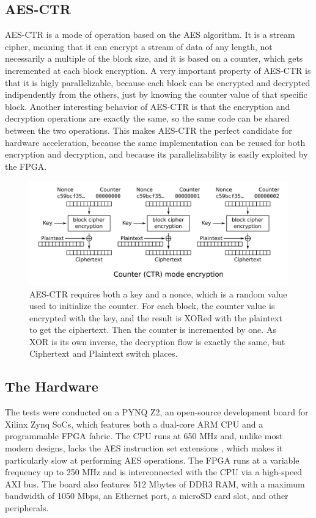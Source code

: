 \documentclass[12pt,oneside,a4paper]{article}
\begin{document}
\subsection{AES-CTR} \label{subsec:aes-ctr}
AES-CTR \cite{aes:ctr} is a mode of operation based on the AES algorithm. It is a stream cipher, meaning that it can encrypt a stream of data of any length, not necessarily a multiple of the block size, and it is based on a counter, which gets incremented at each block encryption.
A very important property of AES-CTR is that it is higly parallelizable, because each block can be encrypted and decrypted indipendently from the others, just by knowing the counter value of that specific block.
Another interesting behavior of AES-CTR is that the encryption and decryption operations are exactly the same, so the same code can be shared between the two operations.
This makes AES-CTR the perfect candidate for hardware acceleration, because the same implementation can be reused for both encryption and decryption, and because its parallelizability is easily exploited by the FPGA.
\begin{figure}[h!]
	\centering
	\includegraphics[width=\textwidth]{CTR_encryption_scheme.png}
	\caption{AES-CTR requires both a key and a nonce, which is a random value used to initialize the counter. For each block, the counter value is encrypted with the key, and the result is XORed with the plaintext to get the ciphertext. Then the counter is incremented by one. As XOR is its own inverse, the decryption flow is exactly the same, but Ciphertext and Plaintext switch places. \cite{pic:aes-ctr}}
\end{figure}

\subsection{The Hardware} \label{subsec:the-hardware}
The tests were conducted on a PYNQ Z2, an open-source development board for Xilinx Zynq SoCs, which features both a dual-core ARM CPU and a programmable FPGA fabric.
The CPU runs at 650 MHz and, unlike most modern designs, lacks the AES instruction set extensions \cite {aes:arm-extensions}, which makes it particularly slow at performing AES operations.
The FPGA runs at a variable frequency up to 250 MHz and is interconnected with the CPU via a high-speed AXI bus.
The board also features 512 Mbytes of DDR3 RAM, with a maximum bandwidth of 1050 Mbps, an Ethernet port, a microSD card slot, and other peripherals.
\end{document}
